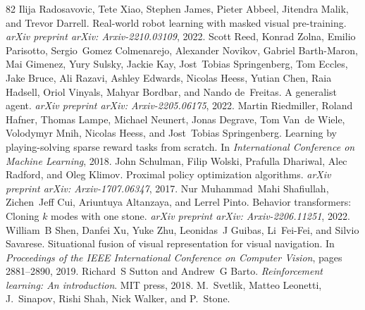 \documentclass{article}
\begin{document}
\begin{thebibliography}{82}
Ilija Radosavovic, Tete Xiao, Stephen James, Pieter Abbeel, Jitendra Malik, and Trevor Darrell.
\newblock Real-world robot learning with masked visual pre-training.
\newblock \emph{arXiv preprint arXiv: Arxiv-2210.03109}, 2022.
Scott Reed, Konrad Zolna, Emilio Parisotto, Sergio~Gomez Colmenarejo, Alexander Novikov, Gabriel Barth-Maron, Mai Gimenez, Yury Sulsky, Jackie Kay, Jost~Tobias Springenberg, Tom Eccles, Jake Bruce, Ali Razavi, Ashley Edwards, Nicolas Heess, Yutian Chen, Raia Hadsell, Oriol Vinyals, Mahyar Bordbar, and Nando de~Freitas.
\newblock A generalist agent.
\newblock \emph{arXiv preprint arXiv: Arxiv-2205.06175}, 2022.
Martin Riedmiller, Roland Hafner, Thomas Lampe, Michael Neunert, Jonas Degrave, Tom Van~de Wiele, Volodymyr Mnih, Nicolas Heess, and Jost~Tobias Springenberg.
\newblock Learning by playing-solving sparse reward tasks from scratch.
\newblock In \emph{International Conference on Machine Learning}, 2018.
John Schulman, Filip Wolski, Prafulla Dhariwal, Alec Radford, and Oleg Klimov.
\newblock Proximal policy optimization algorithms.
\newblock \emph{arXiv preprint arXiv: Arxiv-1707.06347}, 2017.
Nur Muhammad~Mahi Shafiullah, Zichen~Jeff Cui, Ariuntuya Altanzaya, and Lerrel Pinto.
\newblock Behavior transformers: Cloning $k$ modes with one stone.
\newblock \emph{arXiv preprint arXiv: Arxiv-2206.11251}, 2022.
William~B Shen, Danfei Xu, Yuke Zhu, Leonidas~J Guibas, Li~Fei-Fei, and Silvio Savarese.
\newblock Situational fusion of visual representation for visual navigation.
\newblock In \emph{Proceedings of the IEEE International Conference on Computer Vision}, pages 2881--2890, 2019.
Richard~S Sutton and Andrew~G Barto.
\newblock \emph{Reinforcement learning: An introduction}.
\newblock MIT press, 2018.
M.~Svetlik, Matteo Leonetti, J.~Sinapov, Rishi Shah, Nick Walker, and P.~Stone.

\end{thebibliography}
\end{document}
